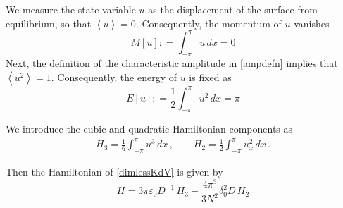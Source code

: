 \documentclass[11pt]{article}
\newcommand{\mean}[1]{\left< #1 \right>}
\newcommand{\eps}{\varepsilon}
\newcommand{\defeq}{\mathrel{\mathop:}=}
\newcommand{\freqp}{f_p}
\newcommand{\lam}{\lambda}
\newcommand{\lamfac}{N}
\newcommand{\epsup}{\eps_0}
\newcommand{\delup}{\delta_0}
\newcommand{\drat}{D}
\newcommand{\Ham}{H}
\newcommand{\dx}{\, dx}
\begin{document}
We measure the state variable $u$ as the displacement of the surface from equilibrium, so that $\mean{u} = 0$. Consequently, the momentum of $u$ vanishes
\begin{equation}
M[u] \defeq \int_{-\pi}^{\pi} u \dx = 0
\end{equation}
Next, the definition of the characteristic amplitude in \eqref{ampdefn} implies that $\mean{u^2} = 1$. Consequently, the energy of $u$ is fixed as
\begin{equation}
E[u] \defeq \frac{1}{2} \int_{-\pi}^{\pi} u^2 \dx = \pi
\end{equation}


We introduce the cubic and quadratic Hamiltonian components as
\begin{align}
H_3 = \frac{1}{6} \int_{-\pi}^{\pi} u^3 \dx	\, , \qquad
H_2 = \frac{1}{2} \int_{-\pi}^{\pi} u_x^2 \dx	\, .
\end{align}

Then the Hamiltonian of \eqref{dimlessKdV} is given by
\begin{equation}
\Ham = 3 \pi \epsup \drat^{-1} \, H_3 - \frac{4 \pi^3}{3 \lamfac^2} \delup^2 \drat \, H_2
\end{equation}

\begin{comment}
Old Note (around May 2019): After giving it some deliberation, I believe we should use $\lamfac=1$. My reason is that the peak in the wave spectrum occurs at a frequency of $\freqp$ or wavelength of $\lam$. In the tKdV Gibbs measure, the spectrum decays monotonically, so that the peak is at the lowest resolved frequency (or largest resolved wavelength). Thus, we want $\lam$ to correspond to the largest resolved wavelength, i.e.~the length of the periodic domain in the tKdV framework.

New Thought (July 2019): Actually, it is very possible that the bandwidth (2 Hz in the experiments) sets the value of $\lamfac$ that is most appropriate, since that bandwidth sets the decay rate of the spectrum. My thinking is that our experimental forcing does not really follow the upstream Gibbs measure all that well (because we did not have that in mind), but perhaps it best approximates the tail decay of some Gibbs measure. Perhaps, the lowest frequencies (i.e. those much slower than 2 Hz that are present in the theory but almost absent in the experiments) do not affect statistics that much.
\end{comment}
\end{document}
